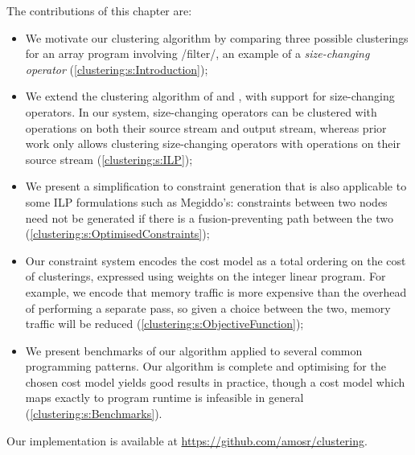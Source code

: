 The contributions of this chapter are:
\begin{itemize}
\item
We motivate our clustering algorithm by comparing three possible clusterings for an array program involving \Hs/filter/, an example of a \emph{size-changing operator} (\cref{clustering:s:Introduction});

\item   
We extend the clustering algorithm of \citet{megiddo1998optimal} and \citet{darte2002contraction}, with support for size-changing operators.
In our system, size-changing operators can be clustered with operations on both their source stream and output stream, whereas prior work only allows clustering size-changing operators with operations on their source stream (\cref{clustering:s:ILP});

\item
We present a simplification to constraint generation that is also applicable to some ILP formulations such as Megiddo's:
constraints between two nodes need not be generated if there is a fusion-preventing path between the two (\cref{clustering:s:OptimisedConstraints});

\item
Our constraint system encodes the cost model as a total ordering on the cost of clusterings, expressed using weights on the integer linear program.
For example, we encode that memory traffic is more expensive than the overhead of performing a separate pass, so given a choice between the two, memory traffic will be reduced (\cref{clustering:s:ObjectiveFunction});

\item
We present benchmarks of our algorithm applied to several common programming patterns.
Our algorithm is complete and optimising for the chosen cost model yields good results in practice, though a cost model which maps exactly to program runtime is infeasible in general (\cref{clustering:s:Benchmarks}).
\end{itemize}

Our implementation is available at \url{https://github.com/amosr/clustering}.



